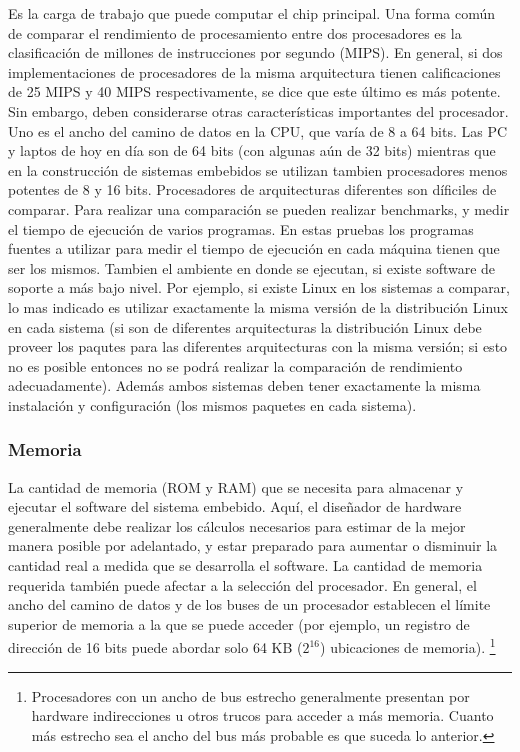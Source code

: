 \documentclass[output=paper, 
colorlinks,
citecolor=brown,
newtxmath
]{langscibook}
\begin{document}
Es la carga de trabajo que puede computar el chip principal. 
Una forma común de comparar el rendimiento de procesamiento entre dos procesadores 
es la clasificación de millones de instrucciones por segundo (MIPS). En general,
si dos implementaciones de procesadores de la misma arquitectura tienen calificaciones 
de 25 MIPS y 40 MIPS respectivamente, se dice que este último es más potente. 
Sin embargo, deben considerarse otras características importantes del procesador. 
Uno es el ancho del camino de datos en la CPU, que varía de 8 a 64 bits. 
Las PC y laptos de hoy en día son de 64 bits (con algunas aún de 32 bits) 
mientras que en la construcción de sistemas embebidos
se utilizan tambien procesadores menos potentes de 8 y 16 bits.
Procesadores de arquitecturas diferentes son díficiles de comparar. Para
realizar una comparación se pueden realizar benchmarks, y medir el tiempo
de ejecución de varios programas. En estas pruebas los programas
fuentes a utilizar para medir el tiempo de ejecución en cada máquina
tienen que ser los mismos. Tambien el ambiente en donde se ejecutan,
si existe software de soporte a más bajo nivel. Por ejemplo, si existe
Linux en los sistemas a comparar, lo mas indicado es utilizar
exactamente la misma versión de la distribución Linux en cada
sistema (si son de diferentes arquitecturas la distribución Linux
debe proveer los paqutes para las diferentes arquitecturas con la misma versión;
si esto no es posible entonces no se podrá realizar la comparación de rendimiento
adecuadamente).
Además ambos sistemas deben tener exactamente la misma instalación y 
configuración (los mismos paquetes en cada sistema).


\subsubsection {Memoria}

La cantidad de memoria (ROM y RAM) que se necesita para almacenar
y ejecutar el software del sistema embebido. Aquí, el diseñador de 
hardware generalmente debe realizar los cálculos necesarios para
estimar de la mejor manera posible por adelantado, y estar preparado para 
aumentar o disminuir la cantidad real a medida que se desarrolla el software. 
La cantidad de memoria requerida también puede afectar a la selección del 
procesador. En general, el ancho del camino de datos y de los buses de un procesador 
establecen el límite superior de memoria a la que se puede 
acceder (por ejemplo, un registro de dirección de 16 bits puede abordar solo 
64 KB ($2^{\text{16}}$) ubicaciones de memoria). \footnote{Procesadores 
con un ancho de bus estrecho generalmente presentan por hardware 
indirecciones u otros trucos para acceder a 
más memoria. Cuanto más estrecho sea el ancho del bus 
más probable es que suceda lo anterior.}
\end{document}
